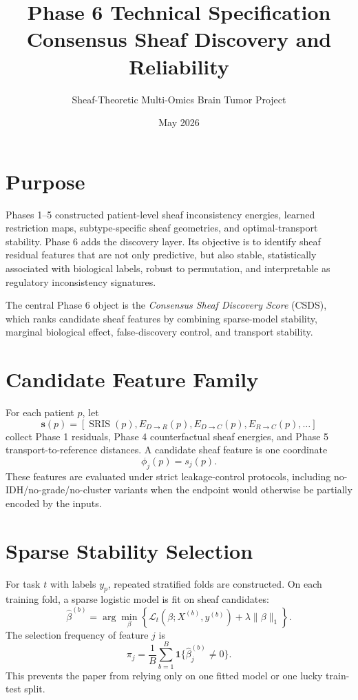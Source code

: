 \documentclass[11pt]{article}
\title{Phase 6 Technical Specification\\Consensus Sheaf Discovery and Reliability}
\author{Sheaf-Theoretic Multi-Omics Brain Tumor Project}
\date{May 2026}
\begin{document}
\maketitle
\tableofcontents
\newpage

\section{Purpose}
Phases 1--5 constructed patient-level sheaf inconsistency energies, learned restriction maps, subtype-specific sheaf geometries, and optimal-transport stability. Phase 6 adds the discovery layer. Its objective is to identify sheaf residual features that are not only predictive, but also stable, statistically associated with biological labels, robust to permutation, and interpretable as regulatory inconsistency signatures.

The central Phase 6 object is the \emph{Consensus Sheaf Discovery Score} (CSDS), which ranks candidate sheaf features by combining sparse-model stability, marginal biological effect, false-discovery control, and transport stability.

\section{Candidate Feature Family}
For each patient $p$, let
\[
\mathbf{s}(p)=\left[\operatorname{SRIS}(p), E_{D\to R}(p), E_{D\to C}(p), E_{R\to C}(p), \ldots \right]
\]
collect Phase 1 residuals, Phase 4 counterfactual sheaf energies, and Phase 5 transport-to-reference distances. A candidate sheaf feature is one coordinate
\[
\phi_j(p)=s_j(p).
\]
These features are evaluated under strict leakage-control protocols, including no-IDH/no-grade/no-cluster variants when the endpoint would otherwise be partially encoded by the inputs.

\section{Sparse Stability Selection}
For task $t$ with labels $y_p$, repeated stratified folds are constructed. On each training fold, a sparse logistic model is fit on sheaf candidates:
\[
\widehat{\beta}^{(b)}
=\arg\min_{\beta}
\left\{\mathcal{L}_t(\beta;X^{(b)},y^{(b)})+\lambda\|\beta\|_1\right\}.
\]
The selection frequency of feature $j$ is
\[
\pi_j=\frac{1}{B}\sum_{b=1}^B \mathbf{1}\{\widehat{\beta}^{(b)}_j\ne 0\}.
\]
This prevents the paper from relying only on one fitted model or one lucky train-test split.
\end{document}
